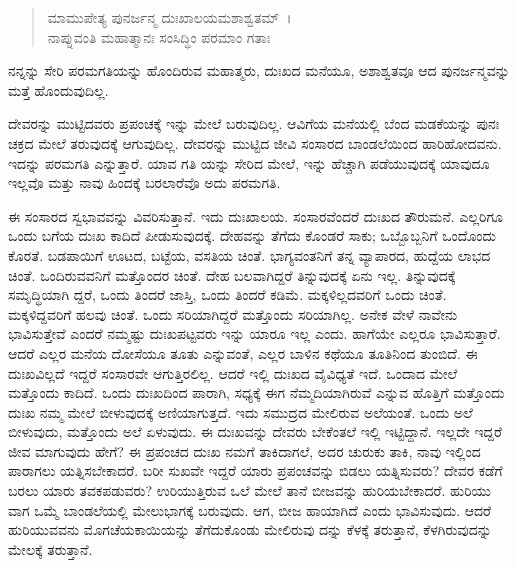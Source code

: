 \begin{verse}
ಮಾಮುಪೇತ್ಯ ಪುನರ್ಜನ್ಮ ದುಃಖಾಲಯಮಶಾಶ್ವತಮ್~।\\ನಾಪ್ನುವಂತಿ ಮಹಾತ್ಮಾನಃ ಸಂಸಿದ್ಧಿಂ ಪರಮಾಂ ಗತಾಃ 
\end{verse}

{\small ನನ್ನನ್ನು ಸೇರಿ ಪರಮಗತಿಯನ್ನು ಹೊಂದಿರುವ ಮಹಾತ್ಮರು, ದುಃಖದ ಮನೆಯೂ, ಅಶಾಶ್ವತವೂ ಆದ ಪುನರ್ಜನ್ಮವನ್ನು ಮತ್ತೆ ಹೊಂದುವುದಿಲ್ಲ.}

ದೇವರನ್ನು ಮುಟ್ಟಿದವರು ಪ್ರಪಂಚಕ್ಕೆ ಇನ್ನು ಮೇಲೆ ಬರುವುದಿಲ್ಲ. ಆವಿಗೆಯ ಮನೆಯಲ್ಲಿ ಬೆಂದ ಮಡಕೆಯನ್ನು ಪುನಃ ಚಕ್ರದ ಮೇಲೆ ತರುವುದಕ್ಕೆ ಆಗುವುದಿಲ್ಲ. ದೇವರನ್ನು ಮುಟ್ಟಿದ ಜೀವಿ ಸಂಸಾರದ ಬಾಂಡಲೆಯಿಂದ ಹಾರಿಹೋದವನು. ಇದನ್ನು ಪರಮಗತಿ ಎನ್ನುತ್ತಾರೆ. ಯಾವ ಗತಿ ಯನ್ನು ಸೇರಿದ ಮೇಲೆ, ಇನ್ನು ಹೆಚ್ಚಾಗಿ ಪಡೆಯುವುದಕ್ಕೆ ಯಾವುದೂ ಇಲ್ಲವೊ ಮತ್ತು ನಾವು ಹಿಂದಕ್ಕೆ ಬರಲಾರೆವೊ ಅದು ಪರಮಗತಿ.

ಈ ಸಂಸಾರದ ಸ್ವಭಾವವನ್ನು ವಿವರಿಸುತ್ತಾನೆ. ಇದು ದುಃಖಾಲಯ. ಸಂಸಾರವೆಂದರೆ ದುಃಖದ ತೌರುಮನೆ. ಎಲ್ಲರಿಗೂ ಒಂದು ಬಗೆಯ ದುಃಖ ಕಾದಿದೆ ಪೀಡುಸುವುದಕ್ಕೆ. ದೇಹವನ್ನು ತೆಗೆದು ಕೊಂಡರೆ ಸಾಕು; ಒಬ್ಬೊಬ್ಬನಿಗೆ ಒಂದೊಂದು ಕೊರತೆ. ಬಡಪಾಯಿಗೆ ಊಟದ, ಬಟ್ಟೆಯ, ವಸತಿಯ ಚಿಂತೆ. ಭಾಗ್ಯವಂತನಿಗೆ ತನ್ನ ವ್ಯಾಪಾರದ, ಹುದ್ದೆಯ ಲಾಭದ ಚಿಂತೆ. ಒಂದಿರುವವನಿಗೆ ಮತ್ತೊಂದರ ಚಿಂತೆ. ದೇಹ ಬಲವಾಗಿದ್ದರೆ ತಿನ್ನುವುದಕ್ಕೆ ಏನು ಇಲ್ಲ. ತಿನ್ನುವುದಕ್ಕೆ ಸಮೃದ್ಧಿಯಾಗಿ ದ್ದರೆ, ಒಂದು ತಿಂದರೆ ಜಾಸ್ತಿ, ಒಂದು ತಿಂದರೆ ಕಡಿಮೆ. ಮಕ್ಕಳಿಲ್ಲದವರಿಗೆ ಒಂದು ಚಿಂತೆ. ಮಕ್ಕಳಿದ್ದವರಿಗೆ ಹಲವು ಚಿಂತೆ. ಒಂದು ಸರಿಯಾಗಿದ್ದರೆ ಮತ್ತೊಂದು ಸರಿಯಾಗಿಲ್ಲ. ಅನೇಕ ವೇಳೆ ನಾವೇನು ಭಾವಿಸುತ್ತೇವೆ ಎಂದರೆ ನಮ್ಮಷ್ಟು ದುಃಖಪಟ್ಟವರು ಇನ್ನು ಯಾರೂ ಇಲ್ಲ ಎಂದು. ಹಾಗೆಯೇ ಎಲ್ಲರೂ ಭಾವಿಸುತ್ತಾರೆ. ಆದರೆ ಎಲ್ಲರ ಮನೆಯ ದೋಸೆಯೂ ತೂತು ಎನ್ನುವಂತೆ, ಎಲ್ಲರ ಬಾಳಿನ ಕಥೆಯೂ ತೂತಿನಿಂದ ತುಂಬಿದೆ. ಈ ದುಃಖವಿಲ್ಲದೆ ಇದ್ದರೆ ಸಂಸಾರವೇ ಆಗುತ್ತಿರಲಿಲ್ಲ. ಆದರೆ ಇಲ್ಲಿ ದುಃಖದ ವೈವಿಧ್ಯತೆ ಇದೆ. ಒಂದಾದ ಮೇಲೆ ಮತ್ತೊಂದು ಕಾದಿದೆ. ಒಂದು ದುಃಖದಿಂದ ಪಾರಾಗಿ, ಸಧ್ಯಕ್ಕೆ ಈಗ ನೆಮ್ಮದಿಯಾಗಿರುವೆ ಎನ್ನುವ ಹೊತ್ತಿಗೆ ಮತ್ತೊಂದು ದುಃಖ ನಮ್ಮ ಮೇಲೆ ಬೀಳುವುದಕ್ಕೆ ಅಣಿಯಾಗುತ್ತದೆ. ಇದು ಸಮುದ್ರದ ಮೇಲಿರುವ ಅಲೆಯಂತೆ. ಒಂದು ಅಲೆ ಬೀಳುವುದು, ಮತ್ತೊಂದು ಅಲೆ ಏಳುವುದು. ಈ ದುಃಖವನ್ನು ದೇವರು ಬೇಕೆಂತಲೆ ಇಲ್ಲಿ ಇಟ್ಟಿದ್ದಾನೆ. ಇಲ್ಲದೇ ಇದ್ದರೆ ಜೀವ ಮಾಗುವುದು ಹೇಗೆ? ಈ ಪ್ರಪಂಚದ ದುಃಖ ನಮಗೆ ತಾಕಿದಾಗಲೆ, ಅದರ ಚುರುಕು ತಾಕಿ, ನಾವು ಇಲ್ಲಿಂದ ಪಾರಾಗಲು ಯತ್ನಿಸಬೇಕಾದರೆ. ಬರೀ ಸುಖವೇ ಇದ್ದರೆ ಯಾರು ಪ್ರಪಂಚವನ್ನು ಬಿಡಲು ಯತ್ನಿಸುವರು? ದೇವರ ಕಡೆಗೆ ಬರಲು ಯಾರು ತವಕಪಡುವರು? ಉರಿಯುತ್ತಿರುವ ಒಲೆ ಮೇಲೆ ತಾನೆ ಬೀಜವನ್ನು ಹುರಿಯಬೇಕಾದರೆ. ಹುರಿಯು ವಾಗ ಒಮ್ಮೆ ಬಾಂಡಲೆಯಲ್ಲಿ ಮೇಲುಭಾಗಕ್ಕೆ ಬರುವುದು. ಆಗ, ಬೀಜ ಹಾಯಾಗಿದೆ ಎಂದು ಭಾವಿಸುವುದು. ಆದರೆ ಹುರಿಯುವವನು ಮೊಗಚೆಯಕಾಯಿಯನ್ನು ತೆಗೆದುಕೊಂಡು ಮೇಲಿರುವು ದನ್ನು ಕೆಳಕ್ಕೆ ತರುತ್ತಾನೆ, ಕೆಳಗಿರುವುದನ್ನು ಮೇಲಕ್ಕೆ ತರುತ್ತಾನೆ.

